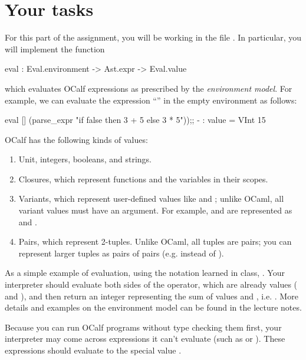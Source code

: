 \documentclass{pset}
\begin{document}
\section*{Your tasks}

For this part of the assignment, you will be working in the file .
In particular, you will implement the function
  \begin{ocaml}
    eval : Eval.environment -> Ast.expr -> Eval.value
  \end{ocaml}
which evaluates OCalf expressions as prescribed by the
\emph{environment model}.  For example, we can evaluate the expression
``'' in the empty environment as follows:
\begin{ocaml}
eval [] (parse_expr "if false then 3 + 5 else 3 * 5"));;
- : value = VInt 15
\end{ocaml}


\medskip

OCalf has the following kinds of values:
\begin{enumerate}
  \item Unit, integers, booleans, and strings.
  \item Closures, which represent functions and the variables in their scopes.
  \item Variants, which represent user-defined values like  and ;
        unlike OCaml, all variant values must have an argument.  For example,
         and  are represented as  and
        .
  \item Pairs, which represent 2-tuples.  Unlike OCaml, all tuples are pairs;
        you can represent larger tuples as pairs of pairs (e.g.
         instead of ).
\end{enumerate}

As a simple example of evaluation, using the notation learned in class,
. Your interpreter should evaluate both sides of the
\code{+} operator, which are already values ( and ),
and then return an integer representing the sum of values  and ,
i.e. . More details and examples on the environment model can be found in
{the lecture notes}.

Because you can run OCalf programs without type checking them first, your
interpreter may come across expressions it can't evaluate (such as
 or ).  These expressions should
evaluate to the special value .
  
\end{document}
